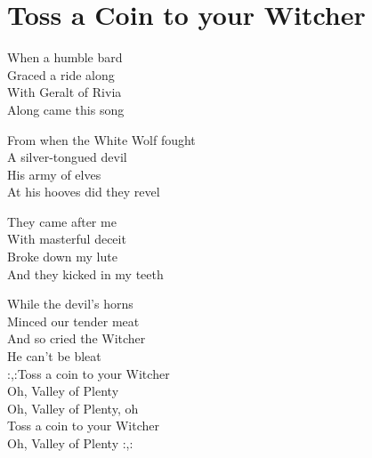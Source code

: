 \section{Toss a Coin to your Witcher}

When a humble bard\\
Graced a ride along\\
With Geralt of Rivia\\
Along came this song

From when the White Wolf fought\\
A silver-tongued devil\\
His army of elves\\
At his hooves did they revel

They came after me\\
With masterful deceit\\
Broke down my lute\\
And they kicked in my teeth

While the devil's horns\\
Minced our tender meat\\
And so cried the Witcher\\
He can't be bleat\\

:,:Toss a coin to your Witcher\\
Oh, Valley of Plenty\\
Oh, Valley of Plenty, oh\\
Toss a coin to your Witcher\\
Oh, Valley of Plenty :,: